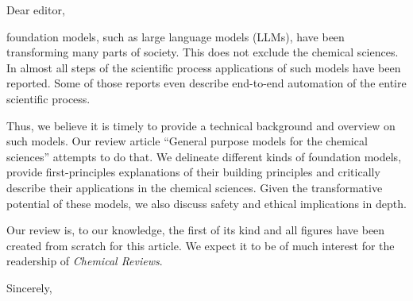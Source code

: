 \documentclass[unijena]{scrlttr2}
\begin{document}
\begin{letter}{%
\hfill
}

\opening{Dear editor,}

foundation models, such as large language models (LLMs), have been transforming many parts of society. 
This does not exclude the chemical sciences. In almost all steps of the scientific process applications of such models have been reported. Some of those reports even describe end-to-end automation of the entire scientific process. 

Thus, we believe it is timely to provide a technical background and overview on such models. Our review article \enquote{General purpose models for the chemical sciences} attempts to do that. 
We delineate different kinds of foundation models, provide first-principles explanations of their building principles and critically describe their applications in the chemical sciences. 
Given the transformative potential of these models, we also discuss safety and ethical implications in depth. 

Our review is, to our knowledge, the first of its kind and all figures have been created from scratch for this article. We expect it to be of much interest for the readership of \textit{Chemical Reviews}.

\closing{Sincerely,\vspace{3em}}




\end{letter}
\end{document}
